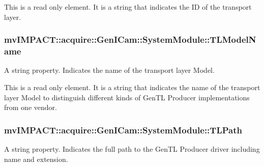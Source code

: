 This is a read only element. It is a string that indicates the I\+D of the transport layer. \hypertarget{classmv_i_m_p_a_c_t_1_1acquire_1_1_gen_i_cam_1_1_system_module_a3dd9e091672c62757fbe1de1cee0f30a}{
\subsubsection[{T\+L\+Model\+Name}]{ mv\+I\+M\+P\+A\+C\+T\+::acquire\+::\+Gen\+I\+Cam\+::\+System\+Module\+::\+T\+L\+Model\+Name}}\label{classmv_i_m_p_a_c_t_1_1acquire_1_1_gen_i_cam_1_1_system_module_a3dd9e091672c62757fbe1de1cee0f30a}


A string property. Indicates the name of the transport layer Model. 

This is a read only element. It is a string that indicates the name of the transport layer Model to distinguish different kinds of Gen\+T\+L Producer implementations from one vendor. \hypertarget{classmv_i_m_p_a_c_t_1_1acquire_1_1_gen_i_cam_1_1_system_module_ab4b4281b0bb95e222f94a4f9df7922e4}{
\subsubsection[{T\+L\+Path}]{ mv\+I\+M\+P\+A\+C\+T\+::acquire\+::\+Gen\+I\+Cam\+::\+System\+Module\+::\+T\+L\+Path}}\label{classmv_i_m_p_a_c_t_1_1acquire_1_1_gen_i_cam_1_1_system_module_ab4b4281b0bb95e222f94a4f9df7922e4}


A string property. Indicates the full path to the Gen\+T\+L Producer driver including name and extension. 

